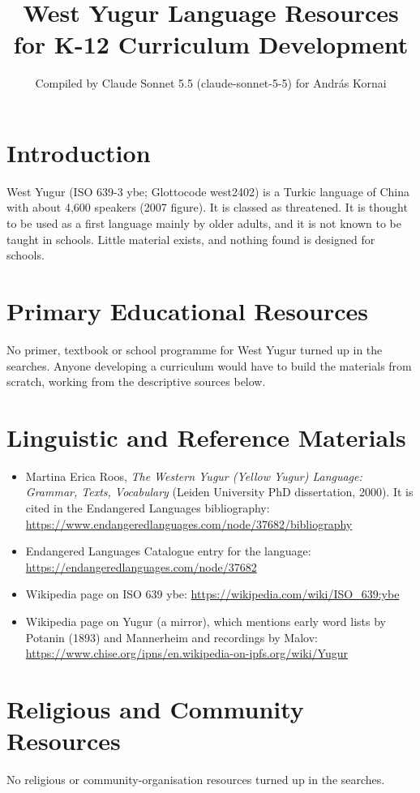 \documentclass[12pt]{article}
\title{West Yugur Language Resources for K-12 Curriculum Development}
\author{Compiled by Claude Sonnet 5.5 (claude-sonnet-5-5) for Andr\'as Kornai}
\date{}
\begin{document}
\maketitle

\section{Introduction}
West Yugur (ISO 639-3 ybe; Glottocode west2402) is a Turkic language of China with about 4,600 speakers (2007 figure). It is classed as threatened. It is thought to be used as a first language mainly by older adults, and it is not known to be taught in schools. Little material exists, and nothing found is designed for schools.

\section{Primary Educational Resources}
No primer, textbook or school programme for West Yugur turned up in the searches. Anyone developing a curriculum would have to build the materials from scratch, working from the descriptive sources below.

\section{Linguistic and Reference Materials}
\begin{itemize}
\item Martina Erica Roos, \emph{The Western Yugur (Yellow Yugur) Language: Grammar, Texts, Vocabulary} (Leiden University PhD dissertation, 2000). It is cited in the Endangered Languages bibliography: \url{https://www.endangeredlanguages.com/node/37682/bibliography}
\item Endangered Languages Catalogue entry for the language: \url{https://endangeredlanguages.com/node/37682}
\item Wikipedia page on ISO 639 ybe: \url{https://wikipedia.com/wiki/ISO_639:ybe}
\item Wikipedia page on Yugur (a mirror), which mentions early word lists by Potanin (1893) and Mannerheim and recordings by Malov: \url{https://www.chise.org/ipns/en.wikipedia-on-ipfs.org/wiki/Yugur}
\end{itemize}

\section{Religious and Community Resources}
No religious or community-organisation resources turned up in the searches.
\end{document}
